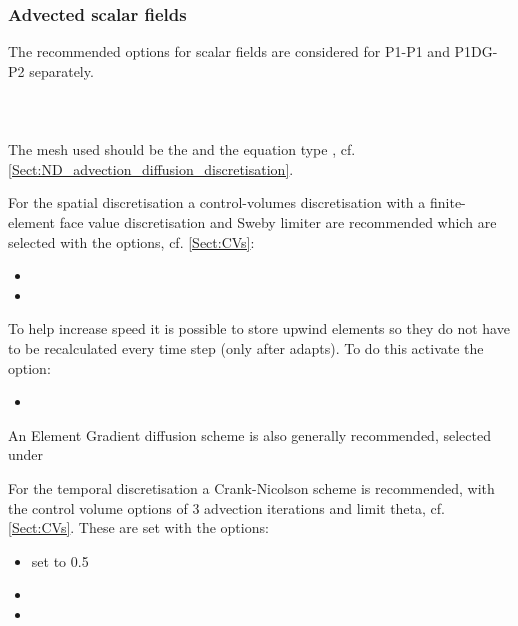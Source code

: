\subsubsection{Advected scalar fields}
The recommended options for scalar fields are considered for P1-P1 and P1DG-P2 separately. \\ \\
{\bf \Poo} \\ \\
The mesh used should be the  and the equation type , cf. \ref{Sect:ND_advection_diffusion_discretisation}. 

For the spatial discretisation a control-volumes discretisation with a finite-element face value discretisation and Sweby limiter are recommended which are selected with the options, cf. \ref{Sect:CVs}:
\begin{itemize}
\item {}
\item {}
\end{itemize}
To help increase speed it is possible to store upwind elements so they do not have to be recalculated every time step (only after adapts). To do this activate the option:
\begin{itemize}
\item{}
\end{itemize}
An Element Gradient diffusion scheme is also generally recommended, selected under 

For the temporal discretisation a Crank-Nicolson scheme is recommended, with the control volume options of 3 advection iterations and limit theta, cf. \ref{Sect:CVs}. These are set with the options:
\begin{itemize}
\item{ set to 0.5}
\item{}
\item{}
\end{itemize}

